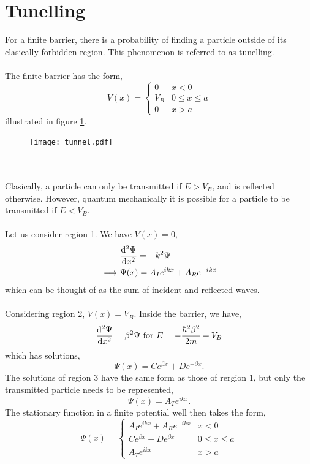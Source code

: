 \documentclass{book}
\begin{document}
\section{Tunelling}
For a finite barrier, there is a probability of finding a particle outside of its clasically forbidden region. This phenomenon is referred to as tunelling.
\\\\
The finite barrier has the form,
\begin{equation}
	V(x) = \begin{cases}
		0 & x < 0 \\
		V_B & 0 \leq x \leq a \\
		0 & x > a
	\end{cases}
\end{equation}
illustrated in figure \ref{tunnel}.
\begin{figure}
	\centering
	\texttt{[image: tunnel.pdf]}
	\caption{}
	\label{tunnel}
\end{figure}
\\\\
Clasically, a particle can only be transmitted if $E > V_B$, and is reflected otherwise. However, quantum mechanically it is possible for a particle to be transmitted if $E < V_B$.
\\\\
Let us consider region 1. We have $V(x) = 0$,
\begin{equation}
	\begin{split}
		& \dv[2]{\Psi}{x} = -k^2 \Psi \\
		\implies & \Psi(x) = A_Ie^{ikx} + A_R e^{-ikx}
	\end{split}
\end{equation}
which can be thought of as the sum of incident and reflected waves.
\\\\
Considering region 2, $V(x) = V_B$. Inside the barrier, we have,
\begin{equation}
	\dv[2]{\Psi}{x} = \beta^2 \Psi \text{ for } E = -\frac{\hbar^2\beta^2}{2m} + V_B
\end{equation}
which has solutions,
\begin{equation}
	\Psi(x) = Ce^{\beta x} + De^{-\beta x}.
\end{equation}
The solutions of region 3 have the same form as those of rergion 1, but only the transmitted particle needs to be represented,
\begin{equation}
	\Psi (x) = A_Te^{ikx}.
\end{equation}
The stationary function in a finite potential well then takes the form,
\begin{equation}
	\Psi(x) = \begin{cases}
		A_Ie^{ikx} + A_Re^{-ikx} & x < 0 \\
		Ce^{\beta x} + De^{\beta x} & 0 \leq x \leq a \\
		A_T e^{ikx} & x > a
	\end{cases}
\end{equation}
\end{document}
